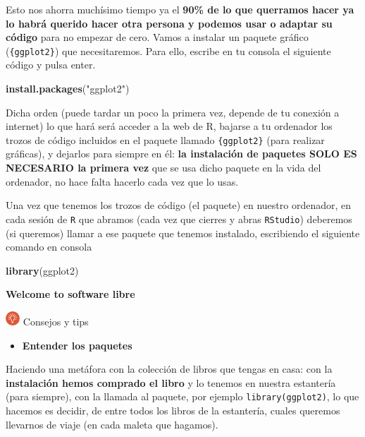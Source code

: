 \documentclass[11pt,]{book}
\newenvironment{Shaded}{\begin{snugshade}}{\end{snugshade}}
\newcommand{\KeywordTok}[1]{\textcolor[rgb]{0.27,0.27,0.27}{\textbf{#1}}}
\newcommand{\NormalTok}[1]{#1}
\newcommand{\StringTok}[1]{\textcolor[rgb]{0.5,0.5,0.5}{#1}}
\providecommand{\tightlist}{%
  \setlength{\itemsep}{0pt}\setlength{\parskip}{0pt}}
\begin{document}
Esto nos ahorra muchísimo tiempo ya el \textbf{90\% de lo que querramos hacer ya lo habrá querido hacer otra persona y podemos usar o adaptar su código} para no empezar de cero. Vamos a instalar un paquete gráfico (\texttt{\{ggplot2\}}) que necesitaremos. Para ello, escribe en tu consola el siguiente código y pulsa enter.

\begin{Shaded}
\begin{Highlighting}[]
\KeywordTok{install.packages}\NormalTok{(}\StringTok{"ggplot2"}\NormalTok{)}
\end{Highlighting}
\end{Shaded}

Dicha orden (puede tardar un poco la primera vez, depende de tu conexión a internet) lo que hará será acceder a la web de R, bajarse a tu ordenador los trozos de código incluidos en el paquete llamado \texttt{\{ggplot2\}} (para realizar gráficas), y dejarlos para siempre en él: \textbf{la instalación de paquetes SOLO ES NECESARIO la primera vez} que se usa dicho paquete en la vida del ordenador, no hace falta hacerlo cada vez que lo usas.

Una vez que tenemos los trozos de código (el paquete) en nuestro ordenador, en cada sesión de \texttt{R} que abramos (cada vez que cierres y abras \texttt{RStudio}) deberemos (si queremos) llamar a ese paquete que tenemos instalado, escribiendo el siguiente comando en consola

\begin{Shaded}
\begin{Highlighting}[]
\KeywordTok{library}\NormalTok{(ggplot2)}
\end{Highlighting}
\end{Shaded}

\textbf{Welcome to software libre}

\includegraphics[width=0.04\textwidth,height=\textheight]{img/logo_info.png} Consejos y tips

\begin{itemize}
\tightlist
\item
  \textbf{Entender los paquetes}
\end{itemize}

Haciendo una metáfora con la colección de libros que tengas en casa: con la \textbf{instalación hemos comprado el libro} y lo tenemos en nuestra estantería (para siempre), con la llamada al paquete, por ejemplo \texttt{library(ggplot2)}, lo que hacemos es decidir, de entre todos los libros de la estantería, cuales queremos llevarnos de viaje (en cada maleta que hagamos).
\end{document}
